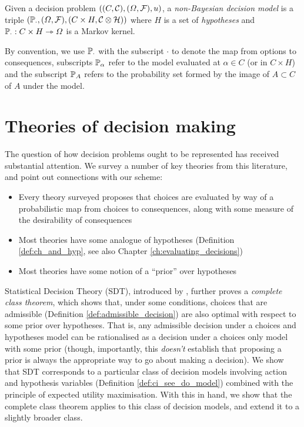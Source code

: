 \begin{definition}\label{def:ch_and_hyp}
Given a decision problem $((C,\mathcal{C}),(\Omega,\mathcal{F}),u)$, a \emph{non-Bayesian decision model} is a triple $(\mathbb{P}_\cdot,(\Omega,\mathcal{F}),(C\times H,\mathcal{C}\otimes\mathcal{H}))$ where $H$ is a set of \emph{hypotheses} and $\mathbb{P}_\cdot:C\times H\rightarrowtriangle \Omega$ is a Markov kernel.
\end{definition}

By convention, we use $\mathbb{P}_\cdot$ with the subscript $\cdot$ to denote the map from options to consequences, subscripts $\mathbb{P}_\alpha$ refer to the model evaluated at $\alpha\in C$ (or in $C\times H$) and the subscript $\mathbb{P}_{A}$ refers to the probability set formed by the image of $A\subset C$ of $A$ under the model.

\section{Theories of decision making}\label{sec:how_represent_conseqeunces}

The question of how decision problems ought to be represented has received substantial attention. We survey a number of key theories from this literature, and point out connections with our scheme:
\begin{itemize}
    \item Every theory surveyed proposes that choices are evaluated by way of a probabilistic map from choices to consequences, along with some measure of the desirability of consequences
    \item Most theories have some analogue of hypotheses (Definition \ref{def:ch_and_hyp}, see also Chapter \ref{ch:evaluating_decisions})
    \item Most theories have some notion of a ``prior'' over hypotheses
\end{itemize}

Statistical Decision Theory (SDT), introduced by \citet{wald_statistical_1950}, further proves a \emph{complete class theorem}, which shows that, under some conditions, choices that are admissible (Definition \ref{def:admissible_decision}) are also optimal with respect to some prior over hypotheses. That is, any admissible decision under a choices and hypotheses model can be rationalised as a decision under a choices only model with some prior (though, importantly, this \emph{doesn't} establish that proposing a prior is always the appropriate way to go about making a decision). We show that SDT corresponds to a particular class of decision models involving action and hypothesis variables (Definition \ref{def:ci_see_do_model}) combined with the principle of expected utility maximisation. With this in hand, we show that the complete class theorem applies to this class of decision models, and extend it to a slightly broader class.

